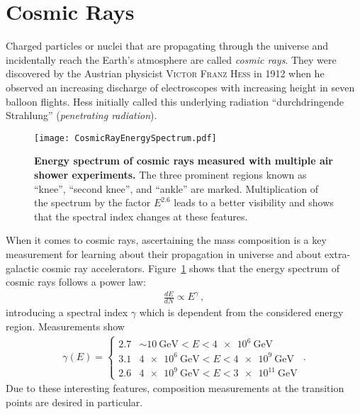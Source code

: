 \section{Cosmic Rays}\label{sec:cosmicrays}

Charged particles or nuclei that are propagating through the universe and incidentally reach the Earth's atmosphere are called \textit{cosmic rays}. They were discovered by the Austrian physicist \textsc{Victor Franz Hess} in 1912 when he observed an increasing discharge of electroscopes with increasing height in seven balloon flights. \cite{cosmicrays:hess} Hess initially called this underlying radiation \enquote{durchdringende Strahlung} (\textit{penetrating radiation}).

\begin{figure}[h]
	\texttt{[image: CosmicRayEnergySpectrum.pdf]}
	\caption[Cosmic ray energy spectrum]{\textbf{Energy spectrum of cosmic rays measured with multiple air shower experiments.} \cite[adapted]{cosmicrays:gaisser} The three prominent regions known as \enquote{knee}, \enquote{second knee}, and \enquote{ankle} are marked. Multiplication of the spectrum by the factor $E^{2.6}$ leads to a better visibility and shows that the spectral index changes at these features.}
	\label{cosmicrays:spectrum}	
\end{figure}

When it comes to cosmic rays, ascertaining the mass composition is a key measurement for learning about their propagation in universe and about extra-galactic cosmic ray accelerators. Figure~\ref{cosmicrays:spectrum} shows that the energy spectrum of cosmic rays follows a power law:
\begin{align}
\frac{dE}{dN}\propto E^\gamma\,,
\end{align}
introducing a spectral index $\gamma$ which is dependent from the considered energy region. Measurements show \cite{cosmicrays:hoerandel, cosmicrays:fowler}
\begin{align}
	\gamma(E)=
	\begin{cases}
		\num{2.7} & \sim\SI{10}{\giga\electronvolt} < E < \SI{4e6}{\giga\electronvolt}\\
		\num{3.1} & \SI{4e6}{\giga\electronvolt} < E < \SI{4e9}{\giga\electronvolt}\\
		\num{2.6} & \SI{4e9}{\giga\electronvolt} < E < \SI{3e11}{\giga\electronvolt}
	\end{cases}\,.
\end{align}
Due to these interesting features, composition measurements at the transition points are desired in particular.

